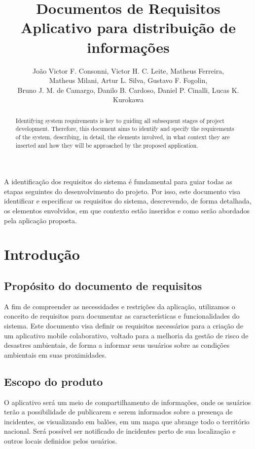 \documentclass[12pt]{article}
\title{Documentos de Requisitos\\ Aplicativo para distribuição de informações}
\author{João Victor F. Consonni\inst{1}, Victor H. C. Leite\inst{1}, Matheus Ferreira\inst{1}, \\Matheus Milani\inst{1}, Artur L. Silva\inst{1}, Gustavo F. Fogolin\inst{1}, \\Bruno J. M. de Camargo\inst{1}, Danilo B. Cardoso\inst{1}, Daniel P. Cinalli\inst{1}, Lucas K. Kurokawa\inst{1}}
\begin{document}
 

\maketitle

\begin{abstract} 
  Identifying system requirements is key to guiding all subsequent stages of project development. Therefore, this document aims to identify and specify the requirements of the system, describing, in detail, the elements involved, in what context they are inserted and how they will be approached by the proposed application.
\end{abstract}

\begin{resumo} 
   A identificação dos requisitos do sistema é fundamental para guiar todas as etapas seguintes do desenvolvimento do projeto. Por isso, este documento visa identificar e especificar os requisitos do sistema, descrevendo, de forma detalhada, os elementos envolvidos, em que contexto estão inseridos e como serão abordados pela aplicação proposta.
\end{resumo}
\section{Introdução}
\subsection{Propósito do documento de requisitos}
A fim de compreender as necessidades e restrições da aplicação, utilizamos o conceito de requisitos para documentar as características e funcionalidades do sistema. Este documento visa definir os requisitos necessários para a criação de um aplicativo mobile colaborativo, voltado para a melhoria da gestão de risco de desastres ambientais, de forma a informar seus usuários sobre as condições ambientais em suas proximidades. 

\subsection{Escopo do produto}
O aplicativo será um meio de compartilhamento de informações, onde os usuários terão a possibilidade de publicarem e serem informados sobre a presença de incidentes, os visualizando em balões, em um mapa que abrange todo o território nacional. Será possível ser notificado de incidentes perto de sua localização e outros locais definidos pelos usuários. 
\end{document}
